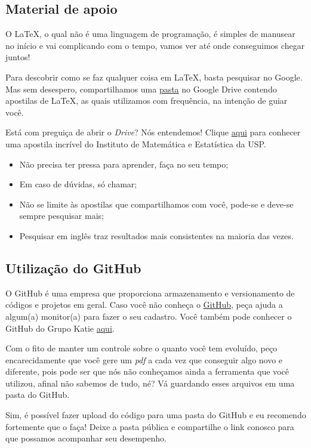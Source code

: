 \documentclass{article}
\begin{document}
\subsection{Material de apoio}
O \LaTeX, o qual não é uma linguagem de programação, é simples de manusear no início e vai complicando com o tempo, vamos ver até onde conseguimos chegar juntos!

Para descobrir como se faz qualquer coisa em \LaTeX, basta pesquisar no Google. Mas sem desespero, compartilhamos uma \href{https://drive.google.com/open?id=1iMswdfMALd7LLEmVAkGpLoclAJe6kZuR}{pasta} no Google Drive contendo apostilas de \LaTeX, as quais utilizamos com frequência, na intenção de guiar você.

Está com preguiça de abrir o \textit{Drive}? Nós entendemos! Clique \href{https://www.ime.usp.br/~viviane/MAP2212/minicurso.pdf}{aqui} para conhecer uma apostila incrível do Instituto de Matemática e Estatística da USP.


\begin{itemize}
    \item Não precisa ter pressa para aprender, faça no seu tempo;
    \item Em caso de dúvidas, só chamar;
    \item Não se limite às apostilas que compartilhamos com você, pode-se e deve-se sempre pesquisar mais;
    \item Pesquisar em inglês traz resultados mais consistentes na maioria das vezes.
\end{itemize}

\subsection{Utilização do GitHub}
O GitHub é uma empresa que proporciona armazenamento e versionamento de códigos e projetos em geral. Caso você não conheça o \href{https://github.com/}{GitHub}, peça ajuda a algum(a) monitor(a) para fazer o seu cadastro. Você também pode conhecer o GitHub do Grupo Katie \href{https://github.com/GrupoKatie}{aqui}.

Com o fito de manter um controle sobre o quanto você tem evoluído, peço encarecidamente que você gere um \textit{pdf} a cada vez que conseguir algo novo e diferente, pois pode ser que nós não conheçamos ainda a ferramenta que você utilizou, afinal não sabemos de tudo, né? Vá guardando esses arquivos em uma pasta do GitHub.

Sim, é possível fazer upload do código para uma pasta do GitHub e eu recomendo fortemente que o faça! Deixe a pasta pública e compartilhe o link conosco para que possamos acompanhar seu desempenho.
\end{document}
